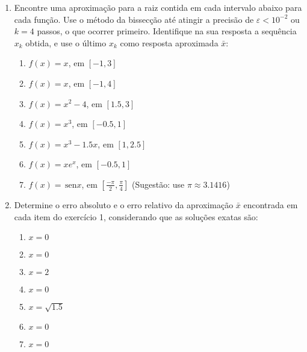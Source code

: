 \documentclass[a4paper]{article}
\providecommand{\sin}{} \renewcommand{\sin}{\hspace{2pt}\mathrm{sen}}
\begin{document}
\begin{enumerate}
\item Encontre uma aproximação para a raiz contida em cada intervalo
  abaixo para cada função. Use o método da bissecção até atingir a
  precisão de $\varepsilon<10^{-2}$ ou $k=4$ passos, o que ocorrer
  primeiro. Identifique na sua resposta a sequência $x_k$ obtida, e
  use o último $x_k$ como resposta aproximada $\bar{x}$:

  \begin{enumerate}
  \item $f(x) = x$, em $[-1, 3]$
  \item $f(x) = x$, em $[-1, 4]$
  \item $f(x) = x^2 - 4$, em $[1.5, 3]$
  \item $f(x) = x^3$, em $[-0.5, 1]$
  \item $f(x) = x^3-1.5x$, em $[1, 2.5]$
  \item $f(x) = x e^x$, em $[-0.5, 1]$
  \item $f(x) = \sin x$, em
    $\left[\frac{-\pi}{2},\frac{\pi}{4}\right]$ (Sugestão: use $\pi
    \approx 3.1416$)
  \end{enumerate}

\item Determine o erro absoluto e o erro relativo da aproximação
  $\bar{x}$ encontrada em cada item do exercício 1, considerando que
  as soluções exatas são:
  \begin{enumerate}
  \item $x=0$ %
  \item $x=0$ %
  \item $x=2$ %
  \item $x=0$ %
  \item $x=\sqrt{1.5}$ %
  \item $x=0$ %
  \item $x=0$ %
  \end{enumerate}



\end{enumerate}
\end{document}

